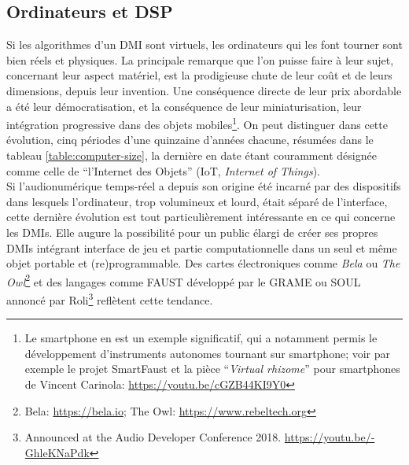 \subsection{Ordinateurs et DSP}
\label{sec:interfaces:computers_and_dsp}

\noindent Si les algorithmes d'un \gls{DMI} sont virtuels, les ordinateurs qui les font tourner sont bien réels et physiques. La principale remarque que l'on puisse faire à leur sujet, concernant leur aspect matériel, est la prodigieuse chute de leur coût et de leurs dimensions, depuis leur invention. Une conséquence directe de leur prix abordable a été leur démocratisation, et la conséquence de leur miniaturisation, leur intégration progressive dans des objets mobiles\footnote{Le smartphone en est un exemple significatif, qui a notamment permis le développement d'instruments autonomes tournant sur smartphone; voir par exemple le projet SmartFaust et la pièce ``\textit{Virtual rhizome}'' pour smartphones de Vincent Carinola: \url{https://youtu.be/cGZB44KI9Y0}}. On peut distinguer dans cette évolution, cinq périodes d'une quinzaine d'années chacune, résumées dans le tableau \ref{table:computer-size}, la dernière en date étant couramment désignée comme celle de ``l'Internet des Objets'' (IoT, \textit{Internet of Things}).\\
\indent Si l'audionumérique temps-réel a depuis son origine été incarné par des dispositifs dans lesquels l'ordinateur, trop volumineux et lourd, était séparé de l'interface, cette dernière évolution est tout particulièrement intéressante en ce qui concerne les \glspl{DMI}. Elle augure la possibilité pour un public élargi de créer ses propres \glspl{DMI} intégrant interface de jeu et partie computationnelle dans un seul et même objet portable et (re)programmable. Des cartes électroniques comme \textit{Bela} ou \textit{The Owl}\footnote{Bela: \url{https://bela.io}; The Owl: \url{https://www.rebeltech.org}} et des langages comme \gls{FAUST} développé par le \gls{GRAME} \cite{orlarey_faust_2008} ou SOUL annoncé par Roli\footnote{Announced at the Audio Developer Conference 2018. \url{https://youtu.be/-GhleKNaPdk}} reflètent cette tendance.

